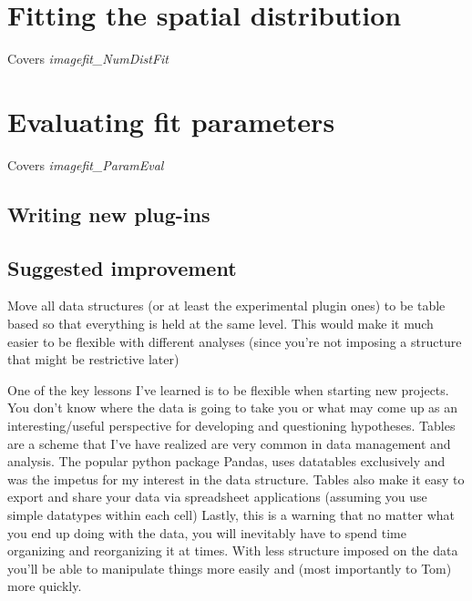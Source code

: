 \section{Fitting the spatial distribution}

Covers \emph{imagefit\_NumDistFit}

\section{Evaluating fit parameters}

Covers \emph{imagefit\_ParamEval}

\subsection{Writing new plug-ins}

\subsection{Suggested improvement}

Move all data structures (or at least the experimental plugin ones) to be table based so that everything is held at the same level. This would make it much easier to be flexible with different analyses (since you're not imposing a structure that might be restrictive later)

One of the key lessons I've learned is to be flexible when starting new projects. You don't know where the data is going to take you or what may come up as an interesting/useful perspective for developing and questioning hypotheses. Tables are a scheme that I've have realized are very common in data management and analysis. The popular python package Pandas, uses datatables exclusively and was the impetus for my interest in the data structure. Tables also make it easy to export and share your data via spreadsheet applications (assuming you use simple datatypes within each cell) Lastly, this is a warning that no matter what you end up doing with the data, you will inevitably have to spend time organizing and reorganizing it at times. With less structure imposed on the data you'll be able to manipulate things more easily and (most importantly to Tom) more quickly.